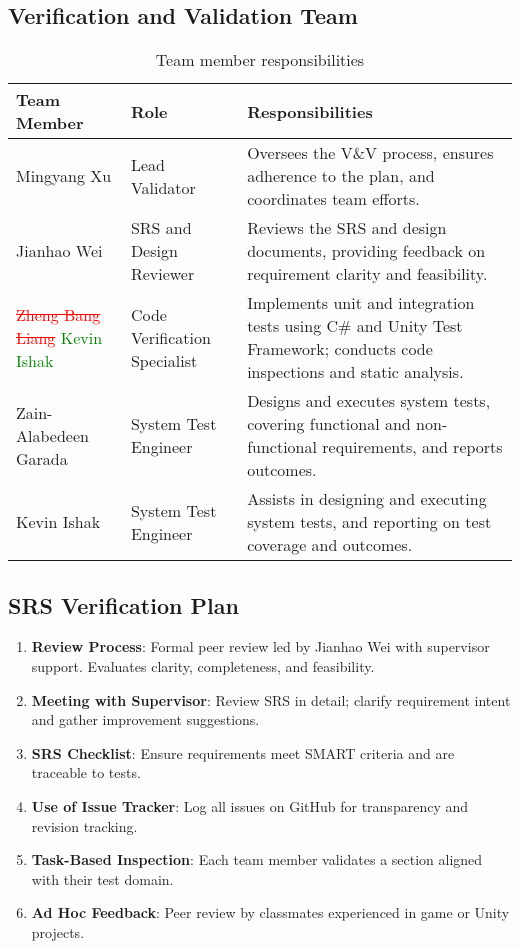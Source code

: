\documentclass[12pt]{article}
\newcommand{\removed}[1]{\textcolor{red}{\sout{#1}}}
\newcommand{\added}[1]{\textcolor{green}{#1}}
\begin{document}
\subsection{Verification and Validation Team}

\begin{table}[H]
\centering
\small
\begin{tabularx}{\textwidth}{|l|l|X|}
\hline
\textbf{Team Member} & \textbf{Role} & \textbf{Responsibilities} \\ \hline
Mingyang Xu & Lead Validator & Oversees the V\&V process, ensures adherence to the plan, and coordinates team efforts. \\ \hline
Jianhao Wei & SRS and Design Reviewer & Reviews the SRS and design documents, providing feedback on requirement clarity and feasibility. \\ \hline
\removed{Zheng Bang Liang} \added{Kevin Ishak} & Code Verification Specialist & Implements unit and integration tests using C\# and Unity Test Framework; conducts code inspections and static analysis. \\ \hline
Zain-Alabedeen Garada & System Test Engineer & Designs and executes system tests, covering functional and non-functional requirements, and reports outcomes. \\ \hline
Kevin Ishak & System Test Engineer & Assists in designing and executing system tests, and reporting on test coverage and outcomes. \\ \hline
\end{tabularx}
\caption{Team member responsibilities}
\end{table}

\FloatBarrier

\subsection{SRS Verification Plan}
\begin{enumerate}
    \item \textbf{Review Process}: Formal peer review led by Jianhao Wei with supervisor support. Evaluates clarity, completeness, and feasibility.
    \item \textbf{Meeting with Supervisor}: Review SRS in detail; clarify requirement intent and gather improvement suggestions.
    \item \textbf{SRS Checklist}: Ensure requirements meet SMART criteria and are traceable to tests.
    \item \textbf{Use of Issue Tracker}: Log all issues on GitHub for transparency and revision tracking.
    \item \textbf{Task-Based Inspection}: Each team member validates a section aligned with their test domain.
    \item \textbf{Ad Hoc Feedback}: Peer review by classmates experienced in game or Unity projects.
\end{enumerate}
\end{document}

